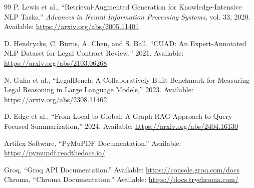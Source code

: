 \documentclass[12pt,a4paper,oneside]{report}
\begin{document}
\renewcommand{\bibname}{References}
\cleardoublepage
{}
{}
\begin{thebibliography}{99}
 P. Lewis et al., ``Retrieval-Augmented Generation for Knowledge-Intensive NLP Tasks,'' \textit{Advances in Neural Information Processing Systems}, vol. 33, 2020. Available: \url{https://arxiv.org/abs/2005.11401}

 D. Hendrycks, C. Burns, A. Chen, and S. Ball, ``CUAD: An Expert-Annotated NLP Dataset for Legal Contract Review,'' 2021. Available: \url{https://arxiv.org/abs/2103.06268}

 N. Guha et al., ``LegalBench: A Collaboratively Built Benchmark for Measuring Legal Reasoning in Large Language Models,'' 2023. Available: \url{https://arxiv.org/abs/2308.11462}

 D. Edge et al., ``From Local to Global: A Graph RAG Approach to Query-Focused Summarization,'' 2024. Available: \url{https://arxiv.org/abs/2404.16130}

 Artifex Software, ``PyMuPDF Documentation.'' Available: \url{https://pymupdf.readthedocs.io/}




 Groq, ``Groq API Documentation.'' Available: \url{https://console.groq.com/docs}
 Chroma, ``Chroma Documentation.'' Available: \url{https://docs.trychroma.com/}
\end{thebibliography}
\end{document}
